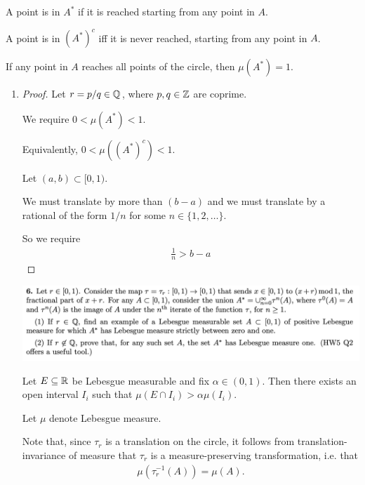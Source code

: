 \begin{intuition*}
  A point is in $A^*$ if it is reached starting from any point in $A$.

  A point is in $(A^*)^c$ iff it is never reached, starting from any point in $A$.

  If any point in $A$ reaches all points of the circle, then $\mu(A^*) = 1$.
\end{intuition*}

\begin{enumerate}
\item
  \begin{proof}
    Let $r = p/q \in \mathbb{Q}$, where $p, q \in \mathbb{Z}$ are coprime.

    We require $0 < \mu(A^*) < 1$.

    Equivalently, $0 < \mu((A^*)^c) < 1$.








    Let $(a, b) \subset [0, 1)$.

    We must translate by more than $(b - a)$ and we must translate by a rational of the form $1/n$ for some $n \in \{1, 2, \ldots\}$.

    So we require
    \begin{align*}
      \frac{1}{n} > b - a
    \end{align*}
  \end{proof}

\includegraphics[width=400pt]{img/analysis--berkeley-202a-hw06-9bc5.png}
  \begin{lemma*}
    Let $E \subseteq \mathbb{R}$ be Lebesgue measurable and fix $\alpha \in (0, 1)$. Then there exists an open
    interval $I_i$ such that $\mu(E \cap I_i) > \alpha \mu(I_i)$.
  \end{lemma*}

    Let $\mu$ denote Lebesgue measure.

    Note that, since $\tau_r$ is a translation on the circle, it follows from translation-invariance of measure
    that $\tau_r$ is a measure-preserving transformation, i.e. that
    \begin{align*}
      \mu(\tau_r^{-1}(A)) = \mu(A).
    \end{align*}


\end{enumerate}
